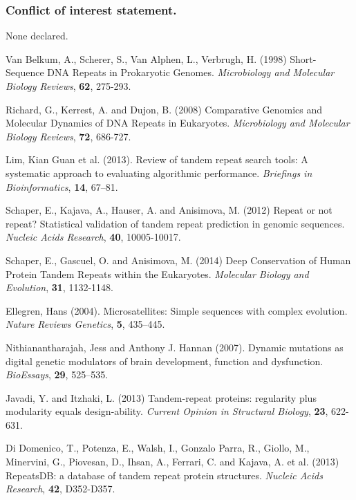 \documentclass[a4,center,fleqn]{NAR}
\begin{document}
\subsubsection{Conflict of interest statement.} None declared.
\newpage


%
\begin{thebibliography}{4}
Van Belkum, A., Scherer, S., Van Alphen, L., Verbrugh, H. (1998)
Short-Sequence DNA Repeats in Prokaryotic Genomes.
\textit{Microbiology and Molecular Biology Reviews}, \textbf{62}, 275-293.

Richard, G., Kerrest, A. and Dujon, B. (2008) 
Comparative Genomics and Molecular Dynamics of DNA Repeats in Eukaryotes. 
\textit{Microbiology and Molecular Biology Reviews}, \textbf{72}, 686-727.

Lim, Kian Guan et al. (2013). 
Review of tandem repeat search tools: A systematic approach to evaluating algorithmic performance. 
\textit{Briefings in Bioinformatics}, \textbf{14}, 67–81.

Schaper, E., Kajava, A., Hauser, A. and Anisimova, M. (2012) 
Repeat or not repeat? Statistical validation of tandem repeat prediction in genomic sequences. 
\textit{Nucleic Acids Research}, \textbf{40}, 10005-10017.

Schaper, E., Gascuel, O. and Anisimova, M. (2014) 
Deep Conservation of Human Protein Tandem Repeats within the Eukaryotes. 
\textit{Molecular Biology and Evolution}, \textbf{31}, 1132-1148.

Ellegren, Hans (2004). 
Microsatellites: Simple sequences with complex evolution.
\textit{Nature Reviews Genetics}, \textbf{5}, 435–445.

Nithianantharajah, Jess and Anthony J. Hannan (2007). 
Dynamic mutations as digital genetic modulators of brain development, function and dysfunction.
\textit{BioEssays}, \textbf{29}, 525–535.

Javadi, Y. and Itzhaki, L. (2013) 
Tandem-repeat proteins: regularity plus modularity equals design-ability. 
\textit{Current Opinion in Structural Biology}, \textbf{23}, 622-631.

Di Domenico, T., Potenza, E., Walsh, I., Gonzalo Parra, R., Giollo, M., Minervini, G., Piovesan, D., Ihsan, A., Ferrari, C. and Kajava, A. et al. (2013) 
RepeatsDB: a database of tandem repeat protein structures. 
\textit{Nucleic Acids Research}, \textbf{42}, D352-D357.


\end{thebibliography}
\end{document}
